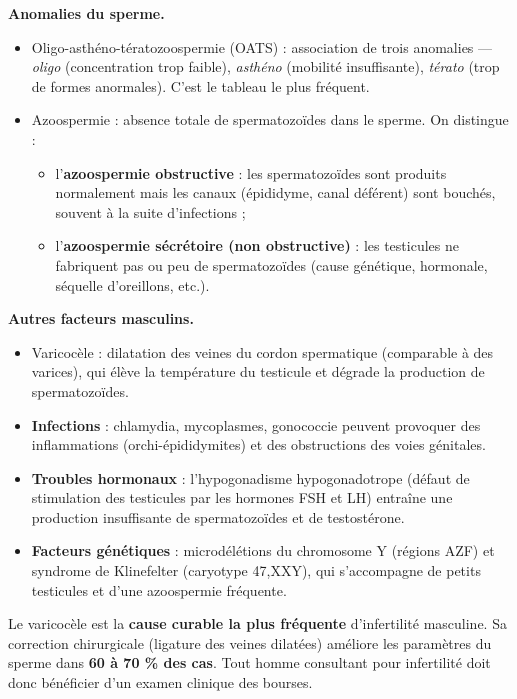 \documentclass[11pt]{article}
\newcommand{\cle}[1]{{\popxbold\color{popdark}#1}}
\begin{document}
\textbf{Anomalies du sperme.}
\begin{itemize}
\item \cle{Oligo-asthéno-tératozoospermie (OATS)} : association de trois anomalies — \emph{oligo} (concentration trop faible), \emph{asthéno} (mobilité insuffisante), \emph{térato} (trop de formes anormales). C'est le tableau le plus fréquent.
\item \cle{Azoospermie} : absence totale de spermatozoïdes dans le sperme. On distingue :
\begin{itemize}
\item l'\textbf{azoospermie obstructive} : les spermatozoïdes sont produits normalement mais les canaux (épididyme, canal déférent) sont bouchés, souvent à la suite d'infections ;
\item l'\textbf{azoospermie sécrétoire (non obstructive)} : les testicules ne fabriquent pas ou peu de spermatozoïdes (cause génétique, hormonale, séquelle d'oreillons, etc.).
\end{itemize}
\end{itemize}

\textbf{Autres facteurs masculins.}
\begin{itemize}
\item \cle{Varicocèle} : dilatation des veines du cordon spermatique (comparable à des varices), qui élève la température du testicule et dégrade la production de spermatozoïdes.
\item \textbf{Infections} : chlamydia, mycoplasmes, gonococcie peuvent provoquer des inflammations (orchi-épididymites) et des obstructions des voies génitales.
\item \textbf{Troubles hormonaux} : l'\cle{hypogonadisme hypogonadotrope} (défaut de stimulation des testicules par les hormones FSH et LH) entraîne une production insuffisante de spermatozoïdes et de testostérone.
\item \textbf{Facteurs génétiques} : \cle{microdélétions du chromosome Y} (régions AZF) et \cle{syndrome de Klinefelter} (caryotype 47,XXY), qui s'accompagne de petits testicules et d'une azoospermie fréquente.
\end{itemize}

\begin{attention}
Le \cle{varicocèle} est la \textbf{cause curable la plus fréquente} d'infertilité masculine. Sa correction chirurgicale (ligature des veines dilatées) améliore les paramètres du sperme dans \textbf{60 à 70 \% des cas}. Tout homme consultant pour infertilité doit donc bénéficier d'un examen clinique des bourses.
\end{attention}
\end{document}
